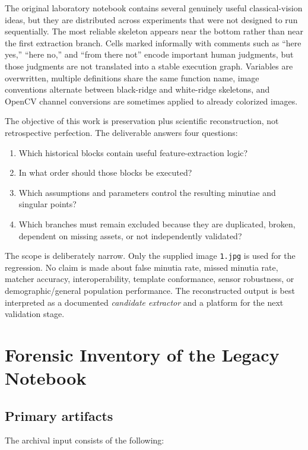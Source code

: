 \documentclass[11pt]{article}
\begin{document}
The original laboratory notebook contains several genuinely useful classical-vision ideas, but they are distributed across experiments that were not designed to run sequentially. The most reliable skeleton appears near the bottom rather than near the first extraction branch. Cells marked informally with comments such as ``here yes,'' ``here no,'' and ``from there not'' encode important human judgments, but those judgments are not translated into a stable execution graph. Variables are overwritten, multiple definitions share the same function name, image conventions alternate between black-ridge and white-ridge skeletons, and OpenCV channel conversions are sometimes applied to already colorized images.

The objective of this work is preservation plus scientific reconstruction, not retrospective perfection. The deliverable answers four questions:

\begin{enumerate}
  \item Which historical blocks contain useful feature-extraction logic?
  \item In what order should those blocks be executed?
  \item Which assumptions and parameters control the resulting minutiae and singular points?
  \item Which branches must remain excluded because they are duplicated, broken, dependent on missing assets, or not independently validated?
\end{enumerate}

The scope is deliberately narrow. Only the supplied image \texttt{1.jpg} is used for the regression. No claim is made about false minutia rate, missed minutia rate, matcher accuracy, interoperability, template conformance, sensor robustness, or demographic/general population performance. The reconstructed output is best interpreted as a documented \emph{candidate extractor} and a platform for the next validation stage.

\section{Forensic Inventory of the Legacy Notebook}

\subsection{Primary artifacts}

The archival input consists of the following:
\end{document}
